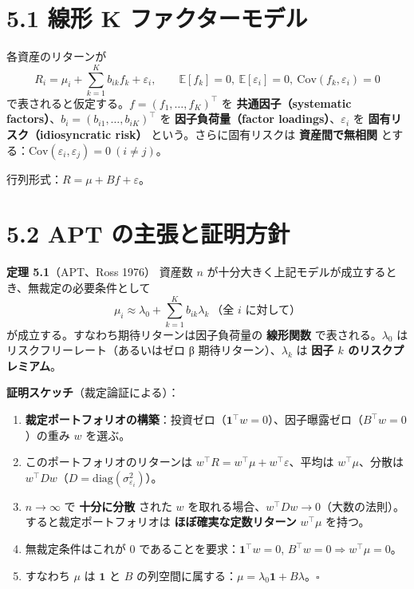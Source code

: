 \documentclass[11pt,a4paper]{report}
\begin{document}
\section{5.1 線形 K ファクターモデル}

各資産のリターンが \[ R_i = \mu_i + \sum_{k=1}^K b_{ik} f_k + \varepsilon_i, \qquad \mathbb{E}[f_k] = 0,\ \mathbb{E}[\varepsilon_i] = 0,\ \mathrm{Cov}(f_k, \varepsilon_i) = 0 \] で表されると仮定する。$f = (f_1, \dots, f_K)^\top$ を \textbf{共通因子（systematic factors）}、$b_i = (b_{i1}, \dots, b_{iK})^\top$ を \textbf{因子負荷量（factor loadings）}、$\varepsilon_i$ を \textbf{固有リスク（idiosyncratic risk）} という。さらに固有リスクは \textbf{資産間で無相関} とする：$\mathrm{Cov}(\varepsilon_i, \varepsilon_j) = 0\ (i \neq j)$。

行列形式：$R = \mu + B f + \varepsilon$。

\section{5.2 APT の主張と証明方針}

\textbf{定理 5.1}（APT、Ross 1976） 資産数 $n$ が十分大きく上記モデルが成立するとき、無裁定の必要条件として \[ \boxed{\; \mu_i \approx \lambda_0 + \sum_{k=1}^K b_{ik} \lambda_k\ \text{（全 } i \text{ に対して）} \;} \] が成立する。すなわち期待リターンは因子負荷量の \textbf{線形関数} で表される。$\lambda_0$ はリスクフリーレート（あるいはゼロ β 期待リターン）、$\lambda_k$ は \textbf{因子 $k$ のリスクプレミアム}。

\textbf{証明スケッチ}（裁定論証による）：

\begin{enumerate}
\item \textbf{裁定ポートフォリオの構築}：投資ゼロ（$\mathbf{1}^\top w = 0$）、因子曝露ゼロ（$B^\top w = 0$）の重み $w$ を選ぶ。
\item このポートフォリオのリターンは $w^\top R = w^\top \mu + w^\top \varepsilon$、平均は $w^\top \mu$、分散は $w^\top D w$（$D = \mathrm{diag}(\sigma_{\varepsilon_i}^2)$）。
\item $n \to \infty$ で \textbf{十分に分散} された $w$ を取れる場合、$w^\top D w \to 0$（大数の法則）。すると裁定ポートフォリオは \textbf{ほぼ確実な定数リターン} $w^\top \mu$ を持つ。
\item 無裁定条件はこれが $0$ であることを要求：$\mathbf{1}^\top w = 0$, $B^\top w = 0 \Rightarrow w^\top \mu = 0$。
\item すなわち $\mu$ は $\mathbf{1}$ と $B$ の列空間に属する：$\mu = \lambda_0 \mathbf{1} + B \lambda$。$\square$
\end{enumerate}
\end{document}
